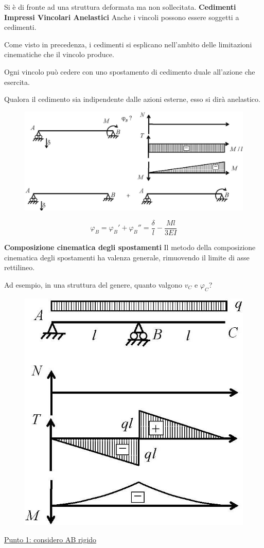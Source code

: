 \documentclass{article}
\begin{document}
\begin{adjustwidth}{2in}{}
		Si è di fronte ad una struttura deformata ma non sollecitata. 
\newpage
{\Large \textbf{Cedimenti Impressi Vincolari Anelastici}} \mbox{} \newline
		Anche i vincoli possono essere soggetti a cedimenti.
		
		Come visto in precedenza, i cedimenti si esplicano nell’ambito delle limitazioni cinematiche che il
		vincolo produce.
		
		Ogni vincolo può cedere con uno spostamento di cedimento duale all’azione che esercita.
		
		Qualora il cedimento sia indipendente dalle azioni esterne, esso si dirà anelastico.
		
\begin{figure}[H]
	\centering
	\includegraphics[width=0.7\linewidth]{"immagini/1.PARTE8_Pagina_19"}
\end{figure}

		\[ \varphi_B = \varphi_B' + \varphi_B'' = \dfrac{\delta}{l} - \dfrac{Ml}{3EI}\]
		
{\Large \textbf{Composizione cinematica degli spostamenti}} \mbox{} \newline
		Il metodo della composizione cinematica degli spostamenti ha valenza generale, rimuovendo il limite
		di asse rettilineo. \newline 
	
		Ad esempio, in una struttura del genere, quanto valgono $v_C$ e $\varphi_C$? 
	
\begin{figure}[H]
	\centering
	\includegraphics[width=0.3\linewidth]{"immagini/1.PARTE8_Pagina_20"}
\end{figure}
\newpage
		\underline{Punto 1: considero AB rigido}
		

\end{adjustwidth}
\end{document}
